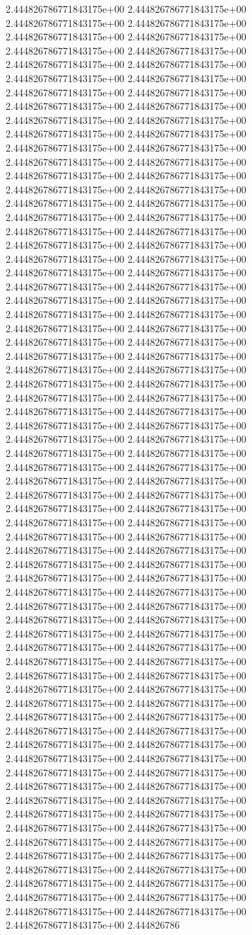 2.444826786771843175e+00	2.444826786771843175e+00	2.444826786771843175e+00	2.444826786771843175e+00	2.444826786771843175e+00	2.444826786771843175e+00	2.444826786771843175e+00	2.444826786771843175e+00	2.444826786771843175e+00	2.444826786771843175e+00	2.444826786771843175e+00	2.444826786771843175e+00	2.444826786771843175e+00	2.444826786771843175e+00	2.444826786771843175e+00	2.444826786771843175e+00	2.444826786771843175e+00	2.444826786771843175e+00	2.444826786771843175e+00	2.444826786771843175e+00	2.444826786771843175e+00	2.444826786771843175e+00	2.444826786771843175e+00	2.444826786771843175e+00	2.444826786771843175e+00	2.444826786771843175e+00	2.444826786771843175e+00	2.444826786771843175e+00	2.444826786771843175e+00	2.444826786771843175e+00	2.444826786771843175e+00	2.444826786771843175e+00	2.444826786771843175e+00	2.444826786771843175e+00	2.444826786771843175e+00	2.444826786771843175e+00	2.444826786771843175e+00	2.444826786771843175e+00	2.444826786771843175e+00	2.444826786771843175e+00	2.444826786771843175e+00	2.444826786771843175e+00	2.444826786771843175e+00	2.444826786771843175e+00	2.444826786771843175e+00	2.444826786771843175e+00	2.444826786771843175e+00	2.444826786771843175e+00	2.444826786771843175e+00	2.444826786771843175e+00	2.444826786771843175e+00	2.444826786771843175e+00	2.444826786771843175e+00	2.444826786771843175e+00	2.444826786771843175e+00	2.444826786771843175e+00	2.444826786771843175e+00	2.444826786771843175e+00	2.444826786771843175e+00	2.444826786771843175e+00	2.444826786771843175e+00	2.444826786771843175e+00	2.444826786771843175e+00	2.444826786771843175e+00	2.444826786771843175e+00	2.444826786771843175e+00	2.444826786771843175e+00	2.444826786771843175e+00	2.444826786771843175e+00	2.444826786771843175e+00	2.444826786771843175e+00	2.444826786771843175e+00	2.444826786771843175e+00	2.444826786771843175e+00	2.444826786771843175e+00	2.444826786771843175e+00	2.444826786771843175e+00	2.444826786771843175e+00	2.444826786771843175e+00	2.444826786771843175e+00	2.444826786771843175e+00	2.444826786771843175e+00	2.444826786771843175e+00	2.444826786771843175e+00	2.444826786771843175e+00	2.444826786771843175e+00	2.444826786771843175e+00	2.444826786771843175e+00	2.444826786771843175e+00	2.444826786771843175e+00	2.444826786771843175e+00	2.444826786771843175e+00	2.444826786771843175e+00	2.444826786771843175e+00	2.444826786771843175e+00	2.444826786771843175e+00	2.444826786771843175e+00	2.444826786771843175e+00	2.444826786771843175e+00	2.444826786771843175e+00	2.444826786771843175e+00	2.444826786771843175e+00	2.444826786771843175e+00	2.444826786771843175e+00	2.444826786771843175e+00	2.444826786771843175e+00	2.444826786771843175e+00	2.444826786771843175e+00	2.444826786771843175e+00	2.444826786771843175e+00	2.444826786771843175e+00	2.444826786771843175e+00	2.444826786771843175e+00	2.444826786771843175e+00	2.444826786771843175e+00	2.444826786771843175e+00	2.444826786771843175e+00	2.444826786771843175e+00	2.444826786771843175e+00	2.444826786771843175e+00	2.444826786771843175e+00	2.444826786771843175e+00	2.444826786771843175e+00	2.444826786771843175e+00	2.444826786771843175e+00	2.444826786771843175e+00	2.444826786771843175e+00	2.444826786771843175e+00	2.444826786771843175e+00	2.444826786771843175e+00	2.444826786771843175e+00	2.444826786771843175e+00	2.444826786771843175e+00	2.444826786